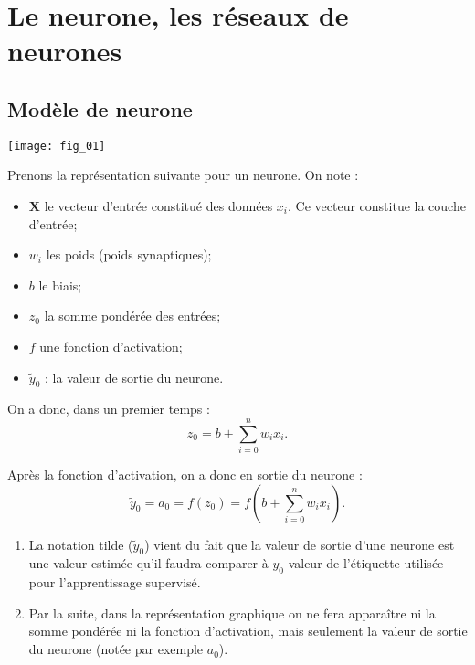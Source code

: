 \section{Le neurone, les réseaux de neurones}

\subsection{Modèle de neurone}

\begin{marginfigure}
\texttt{[image: fig\_01]}
\end{marginfigure}

\begin{defi}


Prenons la représentation suivante pour un neurone. On note :
\begin{itemize}
\item $\mathbf{X}$ le vecteur d'entrée constitué des données $x_i$. Ce vecteur constitue la couche d'entrée;
\item $w_i$ les poids (poids synaptiques);
\item $b$ le biais;
\item $z_0$ la somme pondérée des entrées;
\item $f$ une fonction d'activation; 
\item $\tilde{y}_0$ : la valeur de sortie du neurone.
\end{itemize}

On a donc, dans un premier temps  :
$$z_0 = b+ \sum\limits_{i=0}^{n} w_i x_i. $$

Après la fonction d'activation, on a donc en sortie du neurone :
$$\tilde{y}_0 = a_0 = f(z_0)=f \left( b+ \sum\limits_{i=0}^{n} w_i x_i\right).$$

\begin{remarque}
\begin{enumerate}
\item La notation tilde ($\tilde{y}_0$) vient du fait que la valeur de sortie d'une neurone est une valeur estimée qu'il faudra comparer à ${y}_0$ valeur de l'étiquette utilisée pour l'apprentissage supervisé.
\item Par la suite, dans la représentation graphique on ne fera apparaître ni la somme pondérée ni la fonction d'activation, mais seulement la valeur de sortie du neurone (notée par exemple $a_0$).
\end{enumerate}
\end{remarque}

\end{defi}




